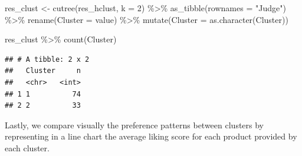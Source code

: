 \documentclass[
]{krantz}
\makeatletter
\newenvironment{Shaded}{\begin{snugshade}}{\end{snugshade}}
\newcommand{\AttributeTok}[1]{\textcolor[rgb]{0.61,0.61,0.61}{#1}}
\newcommand{\DecValTok}[1]{\textcolor[rgb]{0.06,0.06,0.06}{#1}}
\newcommand{\FunctionTok}[1]{\textcolor[rgb]{0,0,0}{#1}}
\newcommand{\NormalTok}[1]{#1}
\newcommand{\OtherTok}[1]{\textcolor[rgb]{0.37,0.37,0.37}{#1}}
\newcommand{\SpecialCharTok}[1]{\textcolor[rgb]{0,0,0}{#1}}
\newcommand{\StringTok}[1]{\textcolor[rgb]{0.5,0.5,0.5}{#1}}
\newenvironment{kframe}{%
\medskip{}
\setlength{\fboxsep}{.8em}
 \def\at@end@of@kframe{}%
 \ifinner\ifhmode%
  \def\at@end@of@kframe{\end{minipage}}%
  \begin{minipage}{\columnwidth}%
 \fi\fi%
 \def\FrameCommand##1{\hskip\@totalleftmargin \hskip-\fboxsep
 \colorbox{shadecolor}{##1}\hskip-\fboxsep
     \hskip-\linewidth \hskip-\@totalleftmargin \hskip\columnwidth}%
 \MakeFramed {\advance\hsize-\width
   \@totalleftmargin\z@ \linewidth\hsize
   \@setminipage}}%
 {\par\unskip\endMakeFramed%
 \at@end@of@kframe}
\renewenvironment{Shaded}{\begin{kframe}}{\end{kframe}}
\makeatother
\begin{document}
\begin{Shaded}
\begin{Highlighting}[]
\NormalTok{res\_clust }\OtherTok{\textless{}{-}} \FunctionTok{cutree}\NormalTok{(res\_hclust, }\AttributeTok{k =} \DecValTok{2}\NormalTok{) }\SpecialCharTok{\%\textgreater{}\%}
  \FunctionTok{as\_tibble}\NormalTok{(}\AttributeTok{rownames =} \StringTok{"Judge"}\NormalTok{) }\SpecialCharTok{\%\textgreater{}\%}
  \FunctionTok{rename}\NormalTok{(}\AttributeTok{Cluster =}\NormalTok{ value) }\SpecialCharTok{\%\textgreater{}\%}
  \FunctionTok{mutate}\NormalTok{(}\AttributeTok{Cluster =} \FunctionTok{as.character}\NormalTok{(Cluster))}

\NormalTok{res\_clust }\SpecialCharTok{\%\textgreater{}\%}
  \FunctionTok{count}\NormalTok{(Cluster)}
\end{Highlighting}
\end{Shaded}

\begin{verbatim}
## # A tibble: 2 x 2
##   Cluster     n
##   <chr>   <int>
## 1 1          74
## 2 2          33
\end{verbatim}

Lastly, we compare visually the preference patterns between clusters by representing in a line chart the average liking score for each product provided by each cluster.
\end{document}
